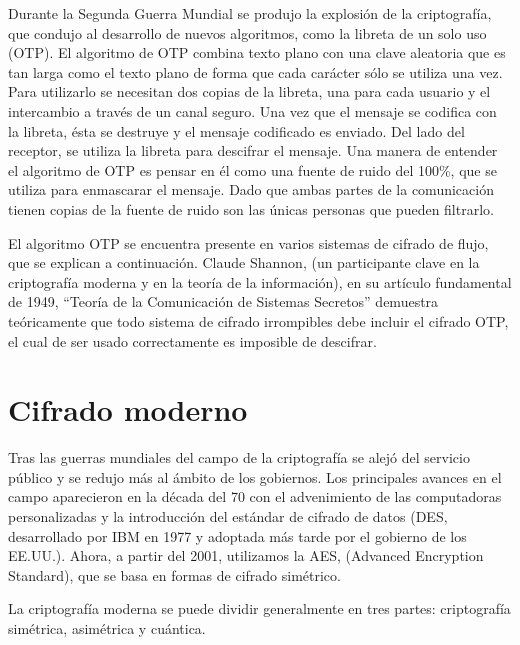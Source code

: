 \documentclass[10pt,a5paper,twoside,,]{book}
\begin{document}
Durante la Segunda Guerra Mundial se produjo la explosión de la
criptografía, que condujo al desarrollo de nuevos algoritmos, como la
libreta de un solo uso (OTP). El algoritmo de OTP combina texto plano
con una clave aleatoria que es tan larga como el texto plano de forma
que cada carácter sólo se utiliza una vez. Para utilizarlo se necesitan
dos copias de la libreta, una para cada usuario y el intercambio a
través de un canal seguro. Una vez que el mensaje se codifica con la
libreta, ésta se destruye y el mensaje codificado es enviado. Del lado
del receptor, se utiliza la libreta para descifrar el mensaje. Una
manera de entender el algoritmo de OTP es pensar en él como una fuente
de ruido del 100\%, que se utiliza para enmascarar el mensaje. Dado que
ambas partes de la comunicación tienen copias de la fuente de ruido son
las únicas personas que pueden filtrarlo.

El algoritmo OTP se encuentra presente en varios sistemas de cifrado de
flujo, que se explican a continuación. Claude Shannon, (un participante
clave en la criptografía moderna y en la teoría de la información), en
su artículo fundamental de 1949, ``Teoría de la Comunicación de Sistemas
Secretos'' demuestra teóricamente que todo sistema de cifrado
irrompibles debe incluir el cifrado OTP, el cual de ser usado
correctamente es imposible de descifrar.

\section{Cifrado moderno}\label{cifrado-moderno}

Tras las guerras mundiales del campo de la criptografía se alejó del
servicio público y se redujo más al ámbito de los gobiernos. Los
principales avances en el campo aparecieron en la década del 70 con el
advenimiento de las computadoras personalizadas y la introducción del
estándar de cifrado de datos (DES, desarrollado por IBM en 1977 y
adoptada más tarde por el gobierno de los EE.UU.). Ahora, a partir del
2001, utilizamos la AES, (Advanced Encryption Standard), que se basa en
formas de cifrado simétrico.

La criptografía moderna se puede dividir generalmente en tres partes:
criptografía simétrica, asimétrica y cuántica.
\end{document}
